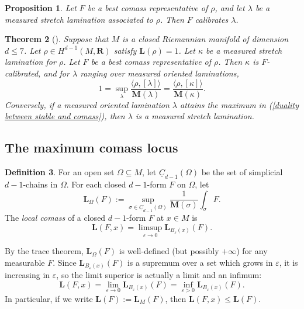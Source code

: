 \documentclass[reqno,11pt]{amsart}
\newcommand{\RR}{\mathbf{R}}
\newcommand{\Chain}{\underline C}
\newcommand{\Mass}{\mathbf M}
\newcommand{\Comass}{\mathbf L}
\newcommand{\dfn}[1]{\emph{#1}\index{#1}}
\newtheorem{theorem}{Theorem}[section]
\newtheorem{proposition}[theorem]{Proposition}
\theoremstyle{definition}
\newtheorem{definition}[theorem]{Definition}
\numberwithin{equation}{section}
\begin{document}
\begin{proposition}\label{MCL contains Thurston}
Let $F$ be a best comass representative of $\rho$, and let $\lambda$ be a measured stretch lamination associated to $\rho$.
Then $F$ calibrates $\lambda$.
\end{proposition}

\begin{theorem}[{\cite[Theorem B]{BackusBest1}}]\label{lams are calibrated}\label{calibrated means measured stretch}
Suppose that $M$ is a closed Riemannian manifold of dimension $d \leq 7$.
Let $\rho \in H^{d - 1}(M, \RR)$ satisfy $\Comass(\rho) = 1$.
Let $\kappa$ be a measured stretch lamination for $\rho$.
Let $F$ be a best comass representative of $\rho$.
Then $\kappa$ is $F$-calibrated, and for $\lambda$ ranging over measured oriented laminations,
\begin{equation}\label{duality between stable and comass}
1 = \sup_\lambda \frac{\langle \rho, [\lambda]\rangle}{\Mass(\lambda)} = \frac{\langle \rho, [\kappa]\rangle}{\Mass(\kappa)}.
\end{equation}
Conversely, if a measured oriented lamination $\lambda$ attains the maximum in (\ref{duality between stable and comass}), then $\lambda$ is a measured stretch lamination.
\end{theorem}

\subsection{The maximum comass locus}
\begin{definition}
For an open set $\Omega \subseteq M$, let $\Chain_{d - 1}(\Omega)$ be the set of simplicial $d - 1$-chains in $\Omega$.
For each closed $d - 1$-form $F$ on $\Omega$, let
$$\Comass_\Omega(F) := \sup_{\sigma \in \Chain_{d - 1}(\Omega)} \frac{1}{\Mass(\sigma)} \int_\sigma F.$$
The \dfn{local comass} of a closed $d - 1$-form $F$ at $x \in M$ is 
$$\Comass(F, x) = \limsup_{\varepsilon \to 0} \Comass_{B_\varepsilon(x)}(F).$$
\end{definition}

By the trace theorem, $\Comass_\Omega(F)$ is well-defined (but possibly $+\infty$) for any measurable $F$.
Since $\Comass_{B_\varepsilon(x)}(F)$ is a supremum over a set which grows in $\varepsilon$, it is increasing in $\varepsilon$, so the limit superior is actually a limit and an infimum:
$$\Comass(F, x) = \lim_{\varepsilon \to 0} \Comass_{B_\varepsilon(x)}(F) = \inf_{\varepsilon > 0} \Comass_{B_\varepsilon(x)}(F).$$
In particular, if we write $\Comass(F) := \Comass_M(F)$, then $\Comass(F, x) \leq \Comass(F)$.
\end{document}
